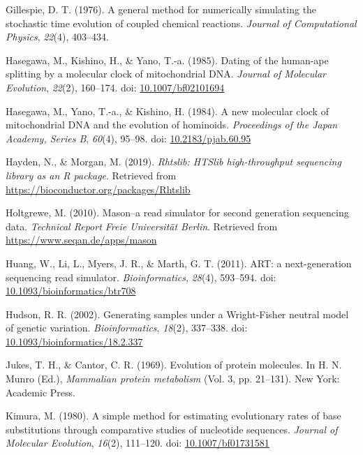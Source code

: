 \documentclass[12pt,]{article}
\begin{document}
\leavevmode\hypertarget{ref-Gillespie_1976}{}%
Gillespie, D. T. (1976). A general method for numerically simulating the stochastic time evolution of coupled chemical reactions. \emph{Journal of Computational Physics}, \emph{22}(4), 403--434.

\leavevmode\hypertarget{ref-Hasegawa_1985}{}%
Hasegawa, M., Kishino, H., \& Yano, T.-a. (1985). Dating of the human-ape splitting by a molecular clock of mitochondrial DNA. \emph{Journal of Molecular Evolution}, \emph{22}(2), 160--174. doi: \href{https://doi.org/10.1007/bf02101694}{10.1007/bf02101694}

\leavevmode\hypertarget{ref-Hasegawa_1984}{}%
Hasegawa, M., Yano, T.-a., \& Kishino, H. (1984). A new molecular clock of mitochondrial DNA and the evolution of hominoids. \emph{Proceedings of the Japan Academy, Series B}, \emph{60}(4), 95--98. doi: \href{https://doi.org/10.2183/pjab.60.95}{10.2183/pjab.60.95}

\leavevmode\hypertarget{ref-Hayden_2019}{}%
Hayden, N., \& Morgan, M. (2019). \emph{Rhtslib: HTSlib high-throughput sequencing library as an R package}. Retrieved from \url{https://bioconductor.org/packages/Rhtslib}

\leavevmode\hypertarget{ref-Holtgrewe_2010}{}%
Holtgrewe, M. (2010). Mason--a read simulator for second generation sequencing data. \emph{Technical Report Freie Universität Berlin}. Retrieved from \url{https://www.seqan.de/apps/mason}

\leavevmode\hypertarget{ref-Huang_2011}{}%
Huang, W., Li, L., Myers, J. R., \& Marth, G. T. (2011). ART: a next-generation sequencing read simulator. \emph{Bioinformatics}, \emph{28}(4), 593--594. doi: \href{https://doi.org/10.1093/bioinformatics/btr708}{10.1093/bioinformatics/btr708}

\leavevmode\hypertarget{ref-Hudson_2002}{}%
Hudson, R. R. (2002). Generating samples under a Wright-Fisher neutral model of genetic variation. \emph{Bioinformatics}, \emph{18}(2), 337--338. doi: \href{https://doi.org/10.1093/bioinformatics/18.2.337}{10.1093/bioinformatics/18.2.337}

\leavevmode\hypertarget{ref-JC69}{}%
Jukes, T. H., \& Cantor, C. R. (1969). Evolution of protein molecules. In H. N. Munro (Ed.), \emph{Mammalian protein metabolism} (Vol. 3, pp. 21--131). New York: Academic Press.

\leavevmode\hypertarget{ref-Kimura_1980}{}%
Kimura, M. (1980). A simple method for estimating evolutionary rates of base substitutions through comparative studies of nucleotide sequences. \emph{Journal of Molecular Evolution}, \emph{16}(2), 111--120. doi: \href{https://doi.org/10.1007/bf01731581}{10.1007/bf01731581}
\end{document}
